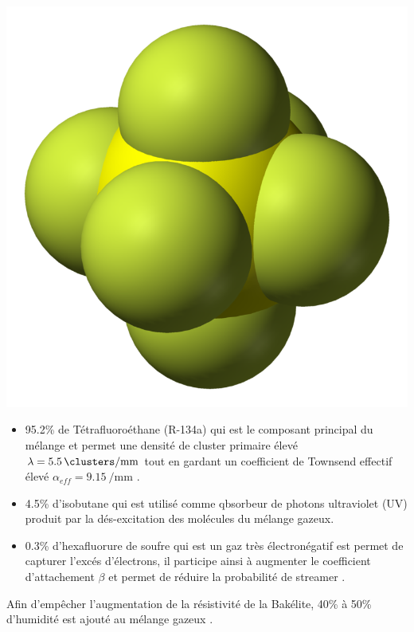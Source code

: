 \marginpar
{
	\centering
	\includegraphics[width=\marginparwidth]{RPC/Sulfurhexafluoride.png}
	\label{hexa}
}

\begin{itemize}[label=$\bullet$]
\item \num{95.2}\% de Tétrafluoroéthane  (R-134a) qui est le composant principal du mélange et permet une densité de cluster primaire élevé $\lambda=\SI{5.5}{\clusters\per\milli\meter}$ tout en gardant un coefficient de Townsend effectif élevé $\alpha_{eff}=\SI{9.15}{\per\milli\meter}$ \cite{CMS-NOTE-1997-004}.
\item \num{4.5}\% d'isobutane  qui est utilisé comme qbsorbeur de photons ultraviolet (UV) produit par la dés-excitation des molécules du mélange gazeux.
\item \num{0.3}\% d'hexafluorure de soufre  qui est un gaz très électronégatif est permet de capturer l'excés d'électrons, il participe ainsi à augmenter le coefficient d'attachement $\beta$ et permet de réduire la probabilité de streamer \cite{Camarri:685607}.
\end{itemize}

Afin d'empêcher l'augmentation de la résistivité de la Bakélite, \num{40}\% à \num{50}\% d'humidité est ajouté au mélange gazeux \cite{Abbrescia:2004fv}.

